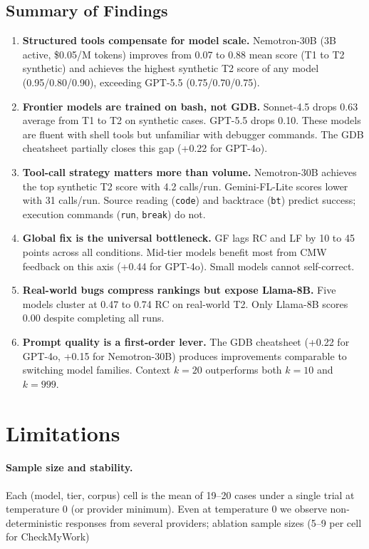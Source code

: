 \documentclass[11pt]{article}
\begin{document}
\subsection{Summary of Findings}
\label{sec:summary}

\begin{enumerate}
    \item \textbf{Structured tools compensate for model scale.} Nemotron-30B (3B active, \$0.05/M tokens) improves from 0.07 to 0.88 mean score (T1 to T2 synthetic) and achieves the highest synthetic T2 score of any model (0.95/0.80/0.90), exceeding GPT-5.5 (0.75/0.70/0.75).

    \item \textbf{Frontier models are trained on bash, not GDB.} Sonnet-4.5 drops 0.63 average from T1 to T2 on synthetic cases. GPT-5.5 drops 0.10. These models are fluent with shell tools but unfamiliar with debugger commands. The GDB cheatsheet partially closes this gap (+0.22 for GPT-4o).

    \item \textbf{Tool-call strategy matters more than volume.} Nemotron-30B achieves the top synthetic T2 score with 4.2 calls/run. Gemini-FL-Lite scores lower with 31 calls/run. Source reading (\texttt{code}) and backtrace (\texttt{bt}) predict success; execution commands (\texttt{run}, \texttt{break}) do not.

    \item \textbf{Global fix is the universal bottleneck.} GF lags RC and LF by 10 to 45 points across all conditions. Mid-tier models benefit most from CMW feedback on this axis (+0.44 for GPT-4o). Small models cannot self-correct.

    \item \textbf{Real-world bugs compress rankings but expose Llama-8B.} Five models cluster at 0.47 to 0.74 RC on real-world T2. Only Llama-8B scores 0.00 despite completing all runs.

    \item \textbf{Prompt quality is a first-order lever.} The GDB cheatsheet (+0.22 for GPT-4o, +0.15 for Nemotron-30B) produces improvements comparable to switching model families. Context $k=20$ outperforms both $k=10$ and $k=999$.
\end{enumerate}

\section*{Limitations}
\paragraph{Sample size and stability.} Each (model, tier, corpus) cell is the mean of
  19--20 cases under a single trial at temperature 0 (or provider minimum). Even at
  temperature 0 we observe non-deterministic responses from several providers; ablation
  sample sizes (5--9 per cell for CheckMyWork)
\end{document}
